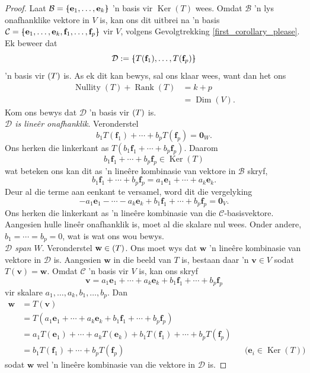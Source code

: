 \documentclass[a4paper,11pt]{book}
\theoremstyle{definition}
\newcommand{\ve}[1]{\mathbf{#1}}
\newcommand{\basis}[1]{{\mathcal #1}}
\newcommand{\bmark}{\raisebox{.53ex}{\rule{.2em}{.1ex}}}
\newcommand{\bopen}{{\protect\ooalign{\{\cr\hfil\bmark\hfil\cr}}}
\newcommand{\bclose}{{\protect\ooalign{\}\cr\hfil\bmark\hfil\cr}}}
\DeclareMathOperator{\Dim}{Dim}
\DeclareMathOperator{\Ker}{Ker}
\DeclareMathOperator{\Nullity}{Nullity}
\DeclareMathOperator{\Rank}{Rank}
\let\Im\relax
\DeclareMathOperator{\Im}{Im} %
\begin{document}
\begin{proof}
	Laat $\basis{B} = \bopen \ve{e}_1, \ldots, \ve{e}_k \bclose$ 'n basis
	vir $\Ker(T)$ wees. Omdat $\basis{B}$ 'n lys onafhanklike vektore in
	$V$ is, kan ons dit uitbrei na 'n basis $\basis{C} = \bopen \ve{e}_1,
	\ldots, \ve{e}_k, \ve{f}_1, \ldots, \ve{f}_p \bclose$ vir $V$, volgens
	Gevolgtrekking \ref{first_corollary_please}. Ek beweer dat
	\[
		\basis{D} := \bopen T(\ve{f}_1), \ldots, T(\ve{f}_p) \bclose
	\]
	'n basis vir $\Im(T)$ is. As ek dit kan bewys, sal ons klaar wees, want
	dan het ons 
	\begin{align*}
		\Nullity(T) + \Rank(T) &= k + p \\
		&= \Dim(V).
	\end{align*}
	Kom ons bewys dat $\basis{D}$ 'n basis vir $\Im(T)$ is. \\

	\noindent \emph{$\basis{D}$ is line{\^e}r onafhanklik}. Veronderstel
	\[
		b_1 T(\ve{f}_1) + \cdots + b_p T(\ve{f}_p) = \ve{0}_W.
	\]
	Ons herken die linkerkant as $T(b_1 \ve{f}_1 + \cdots + b_p \ve{f}_p)$.
	Daarom
	\[
		b_1 \ve{f}_1 + \cdots + b_p \ve{f}_p \in \Ker(T)
	\]
	wat beteken ons kan dit as 'n line{\^e}re kombinasie van vektore in
	$\basis{B}$ skryf,
	\[
		b_1 \ve{f}_1 + \cdots + b_p \ve{f}_p = a_1 \ve{e}_1 + \cdots + a_k
		\ve{e}_k.
	\]
	Deur al die terme aan eenkant te versamel, word dit die vergelyking
	\[
		-a_1 \ve{e}_1 - \cdots -a_k \ve{e}_k + b_1 \ve{f}_1 + \cdots + b_p
		\ve{f}_p = \ve{0}_V.
	\]
	Ons herken die linkerkant as 'n line{\^e}re kombinasie van die
	$\basis{C}$-basisvektore. Aangesien hulle line{\^e}r onafhanklik is,
	moet al die skalare nul wees. Onder andere, $b_1 = \cdots = b_p = 0$,
	wat is wat ons wou bewys. \\

	\noindent \emph{$\basis{D}$ span $W$}. Veronderstel $\ve{w} \in
	\Im(T)$. Ons moet wys dat $\ve{w}$ 'n line{\^e}re kombinasie van
	vektore in $\basis{D}$ is. Aangesien $\ve{w}$ in die beeld van $T$ is,
	bestaan daar 'n $\ve{v} \in V$ sodat $T(\ve{v}) = \ve{w}$. Omdat
	$\basis{C}$ 'n basis vir $V$ is, kan ons skryf
	\[
		\ve{v} = a_1 \ve{e}_1 + \cdots + a_k \ve{e}_k + b_1 \ve{f}_1 +
		\cdots + b_p \ve{f}_p
	\]
	vir skalare $a_1, \ldots, a_k, b_1, \ldots, b_p$. Dan
	\begin{align*}
		\ve{w} &=   T(\ve{v}) \\
		&= T(a_1 \ve{e}_1 + \cdots + a_k \ve{e}_k + b_1 \ve{f}_1 + \cdots +
		b_p \ve{f}_p) \\
		&= a_1 T(\ve{e}_1) + \cdots + a_k T(\ve{e}_k) + b_1 T(\ve{f}_1) +
		\cdots + b_p T(\ve{f}_p) \\
		&= b_1 T(\ve{f}_1) + \cdots + b_p T(\ve{f}_p) && \mbox{($\ve{e}_i
		\in \Ker(T)$)} 
	\end{align*}
	sodat $\ve{w}$ wel 'n line{\^e}re kombinasie van die vektore in
	$\basis{D}$ is.
\end{proof}
\end{document}
